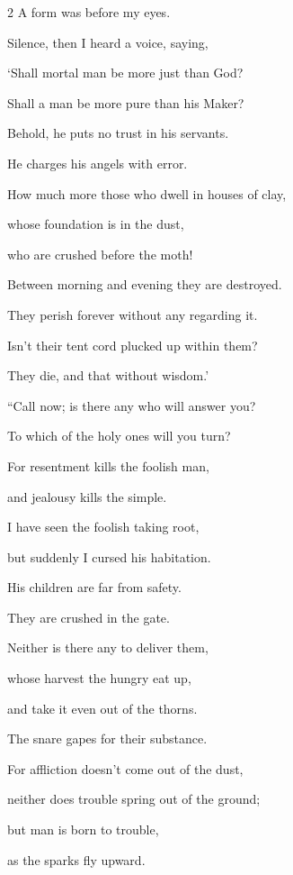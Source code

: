 \begin{multicols}{2}
	A form was before my eyes.
	
	Silence, then I heard a voice, saying,
	
	\myverse{}‘Shall mortal man be more just than God?
	
	Shall a man be more pure than his Maker?
	
	\myverse{}Behold, he puts no trust in his servants.
	
	He charges his angels with error.
	
	\myverse{}How much more those who dwell in houses of clay,
	
	whose foundation is in the dust,
	
	who are crushed before the moth!
	
	\myverse{}Between morning and evening they are destroyed.
	
	They perish forever without any regarding it.
	
	\myverse{}Isn’t their tent cord plucked up within them?
	
	They die, and that without wisdom.’
	
	
	
	\mychapter{} \myverse*{}“Call now; is there any who will answer you?
	
	To which of the holy ones will you turn?
	
	\myverse{}For resentment kills the foolish man,
	
	and jealousy kills the simple.
	
	\myverse{}I have seen the foolish taking root,
	
	but suddenly I cursed his habitation.
	
	\myverse{}His children are far from safety.
	
	They are crushed in the gate.
	
	Neither is there any to deliver them,
	
	\myverse{}whose harvest the hungry eat up,
	
	and take it even out of the thorns.
	
	The snare gapes for their substance.
	
	\myverse{}For affliction doesn’t come out of the dust,
	
	neither does trouble spring out of the ground;
	
	\myverse{}but man is born to trouble,
	
	as the sparks fly upward.
	
	\vspace{\baselineskip}
	

\end{multicols}
